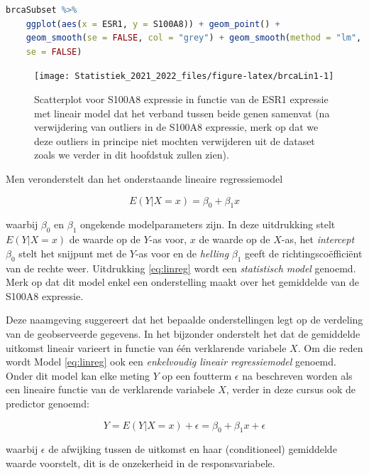\documentclass[
  12pt,dutch,coursenotes]{book}
\theoremstyle{definition}
\theoremstyle{definition}
\theoremstyle{definition}
\theoremstyle{definition}
\theoremstyle{remark}
\begin{document}
\begin{lstlisting}[language=R]
brcaSubset %>%
    ggplot(aes(x = ESR1, y = S100A8)) + geom_point() +
    geom_smooth(se = FALSE, col = "grey") + geom_smooth(method = "lm",
    se = FALSE)
\end{lstlisting}

\begin{figure}

{\centering \texttt{[image: Statistiek\_2021\_2022\_files/figure-latex/brcaLin1-1]} 

}

\caption{Scatterplot voor S100A8 expressie in functie van de ESR1 expressie met lineair model dat het verband tussen beide genen samenvat (na verwijdering van outliers in de S100A8 expressie, merk op dat we deze outliers in principe niet mochten verwijderen uit de dataset zoals we verder in dit hoofdstuk zullen zien).}\label{fig:brcaLin1}
\end{figure}

Men veronderstelt dan het onderstaande lineaire regressiemodel

\begin{equation}
E(Y|X =x)=\beta_0 + \beta_1 x  \label{eq:linreg}
\end{equation}

waarbij \(\beta_0\) en \(\beta_1\) ongekende modelparameters zijn. In deze uitdrukking
stelt \(E(Y|X=x)\) de waarde op de \(Y\)-as voor, \(x\) de waarde op de \(X\)-as,
het \emph{intercept} \(\beta_0\) stelt het snijpunt met de \(Y\)-as voor en de
\emph{helling} \(\beta_1\) geeft de richtingscoëfficiënt van de rechte weer.
Uitdrukking \eqref{eq:linreg} wordt een \emph{statistisch model} genoemd.
Merk op dat dit model enkel een onderstelling maakt over het gemiddelde van de S100A8 expressie.

Deze naamgeving suggereert dat het bepaalde onderstellingen legt op de
verdeling van de geobserveerde gegevens. In het bijzonder onderstelt het dat
de gemiddelde uitkomst lineair varieert in functie van één verklarende variabele \(X\). Om
die reden wordt Model \eqref{eq:linreg} ook een \emph{enkelvoudig lineair regressiemodel} genoemd.
Onder dit model kan elke meting \(Y\) op een foutterm
\(\epsilon\) na beschreven worden als een lineaire functie van de verklarende
variabele \(X\), verder in deze cursus ook de predictor genoemd:

\[Y=E(Y|X=x)+\epsilon=\beta_0+\beta_1 x+\epsilon\]

waarbij \(\epsilon\) de afwijking tussen de uitkomst en haar (conditioneel)
gemiddelde waarde voorstelt, dit is de onzekerheid in de responsvariabele.
\end{document}
